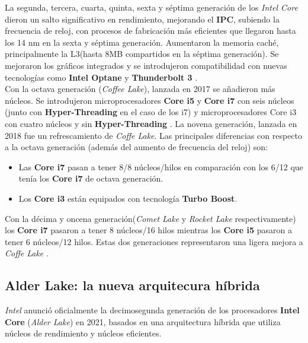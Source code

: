 La segunda, tercera, cuarta, quinta, sexta y séptima generación de los \emph{Intel Core} dieron un salto significativo en rendimiento, mejorando
el \textbf{IPC}, subiendo la frecuencia de reloj,  con   procesos de fabricación  más eficientes que llegaron hasta los 14 nm en la sexta y séptima generación.
Aumentaron la memoria caché, principalmente la L3(hasta 8MB compartidos en la séptima generación). Se mejoraron los gráficos integrados y se introdujeron 
compatibilidad con nuevas tecnologías como \textbf{Intel Optane} y \textbf{Thunderbolt 3} .  \\
Con la octava generación (\emph{Coffee Lake}), lanzada en 2017 se añadieron más núcleos. Se introdujeron microprocesadores \textbf{Core i5} y \textbf{Core i7} 
con seis núcleos (junto con \textbf{Hyper-Threading} en el caso de los i7) y microprocesadores Core i3 con cuatro núcleos y sin \textbf{Hyper-Threading}
.
La novena generación, lanzada en 2018 fue un refrescamiento de \emph{Coffe Lake}. Las principales diferencias con respecto a la 
octava generación  (además del aumento de frecuencia del reloj) son:
\begin{itemize}
	\item Las \textbf{Core i7} pasan a tener 8/8 núcleos/hilos en comparación con los 6/12 que tenía los \textbf{Core i7} de octava generación.
	\item Los \textbf{Core i3} están equipados con tecnología \textbf{Turbo Boost}. 	
\end{itemize}

Con la décima y oncena generación(\emph{Comet Lake} y \emph{Rocket Lake} respectivamente) los \textbf{Core i7} pasaron a tener 8 núcleos/16 hilos mientras 
los \textbf{Core i5} pasaron a tener 6 núcleos/12 hilos. Estas dos generaciones representaron una ligera mejora a \emph{Coffe Lake} 
.

\subsection{Alder Lake: la nueva arquitecura híbrida}

\emph{Intel} anunció oficialmente la decimosegunda generación de los procesadores \textbf{Intel Core} (\emph{Alder Lake}) en 2021, 
basados en una arquitectura híbrida que utiliza núcleos de rendimiento  y núcleos eficientes.

